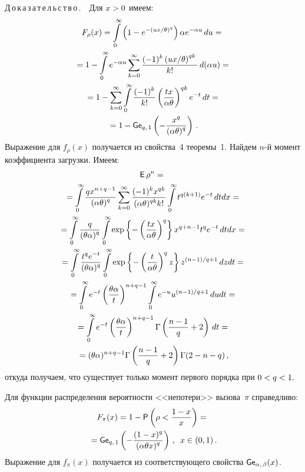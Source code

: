 \begin{multicols}{2}
\noindent
Д\,о\,к\,а\,з\,а\,т\,е\,л\,ь\,с\,т\,в\,о\,.\ \ Для $x\hm>0$ имеем:
\begin{multline*}
F_\rho(x) =
 \int\limits_0^{\infty} \left(1-e^{-(ux/\theta)^q}\right)\alpha e^{-\alpha u}\, du={}\\
 {}=
 1 - \int\limits_0^{\infty} e^{-\alpha u}\sum\limits_{k=0}^\infty 
 \displaystyle\frac{\displaystyle (-1)^k \left(ux/\theta\right)^{qk}\mathstrut}{\displaystyle {k!}\mathstrut} \, d(\alpha u) ={}\\
{}= 1 - \sum\limits_{k=0}^\infty \int\limits_0^{\infty} 
\displaystyle\frac{\displaystyle (-1)^k\mathstrut}{\displaystyle {k!}\mathstrut} \left(
\displaystyle\frac{\displaystyle tx\mathstrut}{\displaystyle {\alpha \theta}\mathstrut}\right)^{qk} e^{-t} \, dt = {}\\
{}=
1 - {\sf Ge}_{q,\, 1}\left(-\displaystyle\frac{\displaystyle x^q\mathstrut}{\displaystyle (\alpha \theta)^q\mathstrut}\right)\,.
\end{multline*}
Выражение для $f_\rho(x)$ получается из свойства~4 теоремы~1.
Найдем $n$-й момент коэффициента загрузки. Имеем:
\begin{multline*}
{\sf E}\,\rho^n ={}\\
{}=
\int\limits_0^\infty 
\displaystyle\frac{\displaystyle qx^{n+q-1}\mathstrut}{\displaystyle {(\alpha\theta )^q}\mathstrut}\sum\limits_{k=0}^\infty
\displaystyle\frac{\displaystyle (-1)^kx^{qk}\mathstrut}{\displaystyle {(\alpha \theta)^{qk}k!}\mathstrut}  
 \int\limits_0^\infty t^{q(k+1)}e^{-t}\, dt dx={}\\
{}= \int\limits_0^\infty \displaystyle\frac{\displaystyle q\mathstrut}{\displaystyle {(\theta \alpha)^q}\mathstrut}
\int\limits_0^\infty \exp\left\lbrace -\left(
\displaystyle\frac{\displaystyle tx\mathstrut}{\displaystyle {\alpha \theta}\mathstrut}\right)^q\right\rbrace x^{q+n-1} t^q e^{-t}\, dt   dx={}\\
 {}= \int\limits_0^\infty \displaystyle\frac{\displaystyle t^q e^{-t}\mathstrut}{\displaystyle {(\theta \alpha)^q}\mathstrut}
\int\limits_0^\infty \exp\left\lbrace -\left(
\displaystyle\frac{\displaystyle t\mathstrut}{\displaystyle {\alpha \theta}\mathstrut}\right)^qz\right\rbrace z^{(n-1)/q + 1} \, dz  dt={}\\
{}= \int\limits_0^\infty e^{-t}\left(
\displaystyle\frac{\displaystyle \theta \alpha\mathstrut}{\displaystyle t\mathstrut}\right)^{n+q-1}\int\limits_0^\infty e^{-u}
 u^{(n-1)/q + 1} \, du dt ={}\\
{}= \int\limits_0^\infty e^{-t}\left(
\displaystyle\frac{\displaystyle \theta \alpha\mathstrut}{\displaystyle {t}\mathstrut}\right)^{n+q-1}\Gamma\left(\displaystyle\frac{\displaystyle n-1\mathstrut}{\displaystyle q\mathstrut} + 2\right) \, dt={}\\
{}=(\theta \alpha)^{n+q-1}\Gamma\left(\displaystyle\frac{\displaystyle n-1\mathstrut}{\displaystyle q\mathstrut} + 2\right) \Gamma (2-n-q)\,, 
\end{multline*}
откуда получаем, что существует только момент первого порядка при $0\hm<q\hm<1.$

Для функции распределения вероятности <<непотери>> вызова~$\pi$ справедливо:
\begin{multline*}
F_\pi(x) = 1 - {\sf P}\left(\rho<
\displaystyle\frac{\displaystyle {1-x}\mathstrut}{\displaystyle {x}\mathstrut}\right)={}\\
{}= {\sf Ge}_{q,\, 1}\left(-\displaystyle\frac{\displaystyle (1-x)^q\mathstrut}{\displaystyle (\alpha \theta x)^q\mathstrut}\right)\,, \enskip
x\in(0,1)\,.
\end{multline*}
Выражение для $f_\pi(x)$ получается из соответст\-ву\-юще\-го свойства 
${\sf Ge}_{\alpha,\, \beta} (x)$.


\end{multicols}
